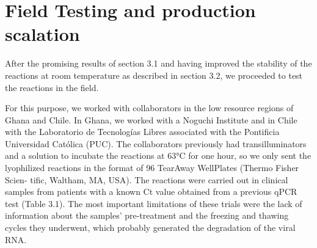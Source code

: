 \section{Field Testing and production scalation} %
After the promising results of section 3.1 and having improved the stability of the reactions at room temperature as described in section 3.2, we proceeded to test the reactions in the field.

For this purpose, we worked with collaborators in the low resource regions of Ghana and Chile. In Ghana, we worked with a Noguchi Institute and in Chile with the Laboratorio de Tecnologías Libres associated with the Pontificia Universidad Católica (PUC). The collaborators previously had transilluminators and a solution to incubate the reactions at 63°C for one hour, so we only sent the lyophilized reactions in the format of 96 TearAway WellPlates (Thermo Fisher Scien-
tific, Waltham, MA, USA). The reactions were carried out in clinical samples from patients with a known Ct value obtained from a previous qPCR test (Table 3.1). The most important limitations of these trials were the lack of information about the samples' pre-treatment and the freezing and thawing cycles they underwent, which probably generated the degradation of the viral RNA. 
\vspace{12pt}
